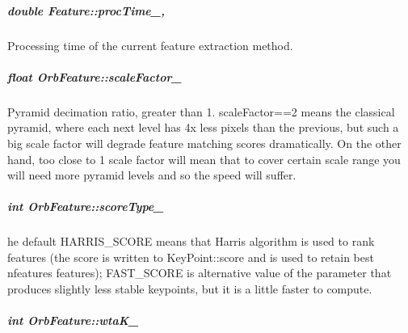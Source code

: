 \hypertarget{group___feature_extractor_a1b176bd48aad30b553e0f87f0264c3d0}{
\subparagraph[{proc\-Time\-\_\-}]{\setlength{\rightskip}{0pt plus 5cm}double Feature\-::proc\-Time\-\_\-\hspace{0.3cm}{\ttfamily [protected]}, {\ttfamily [inherited]}}}\label{group___feature_extractor_a1b176bd48aad30b553e0f87f0264c3d0}


Processing time of the current feature extraction method. 

\hypertarget{group___feature_extractor_a8cbd44d79e8952dd7b51be32d1eaddee}{
\subparagraph[{scale\-Factor\-\_\-}]{\setlength{\rightskip}{0pt plus 5cm}float Orb\-Feature\-::scale\-Factor\-\_\-\hspace{0.3cm}{\ttfamily [private]}}}\label{group___feature_extractor_a8cbd44d79e8952dd7b51be32d1eaddee}


Pyramid decimation ratio, greater than 1. scale\-Factor==2 means the classical pyramid, where each next level has 4x less pixels than the previous, but such a big scale factor will degrade feature matching scores dramatically. On the other hand, too close to 1 scale factor will mean that to cover certain scale range you will need more pyramid levels and so the speed will suffer. 

\hypertarget{group___feature_extractor_a9a4454ef09254b94d88d0b599ad84218}{
\subparagraph[{score\-Type\-\_\-}]{\setlength{\rightskip}{0pt plus 5cm}int Orb\-Feature\-::score\-Type\-\_\-\hspace{0.3cm}{\ttfamily [private]}}}\label{group___feature_extractor_a9a4454ef09254b94d88d0b599ad84218}


he default H\-A\-R\-R\-I\-S\-\_\-\-S\-C\-O\-R\-E means that Harris algorithm is used to rank features (the score is written to Key\-Point\-::score and is used to retain best nfeatures features); F\-A\-S\-T\-\_\-\-S\-C\-O\-R\-E is alternative value of the parameter that produces slightly less stable keypoints, but it is a little faster to compute. 

\hypertarget{group___feature_extractor_a05cc269e6833e1f25c7f7c31928a5ef6}{
\subparagraph[{wta\-K\-\_\-}]{\setlength{\rightskip}{0pt plus 5cm}int Orb\-Feature\-::wta\-K\-\_\-\hspace{0.3cm}{\ttfamily [private]}}}\label{group___feature_extractor_a05cc269e6833e1f25c7f7c31928a5ef6}


